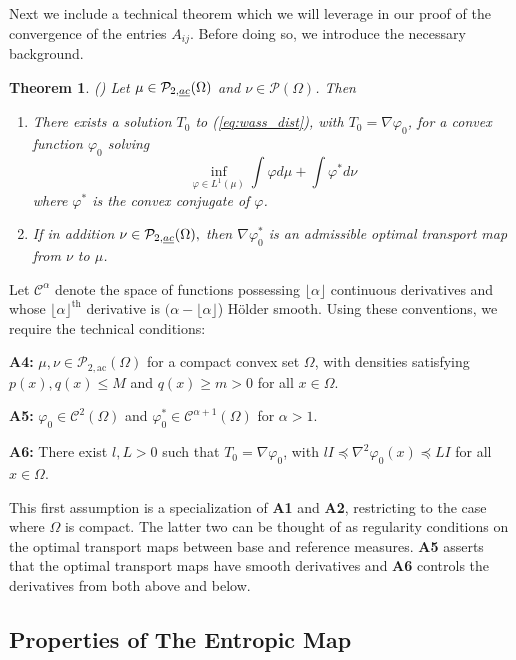\documentclass[nohyperref]{article}
\newtheorem{theorem}{Theorem}
\theoremstyle{definition}
\begin{document}
Next we include a technical theorem which we will leverage in our proof of the convergence of the entries $A_{ij}$. Before doing so, we introduce the necessary background.
\begin{theorem}(\cite{brenier1991polar}) Let $\mu \in \mathcal{P}_{2,\emph{ac}}(\Omega)$ and $\nu \in \mathcal{P}(\Omega)$. Then
\begin{enumerate}
    \item There exists a solution $T_0$ to (\ref{eq:wass_dist}), with $T_0 = \nabla \varphi_0$, for a convex function $\varphi_0$ solving
    $$\inf_{\varphi \in L^1(\mu)} \int \varphi d\mu + \int \varphi^* d\nu$$
    where $\varphi^*$ is the convex conjugate of $\varphi$.
    \item If in addition $\nu \in \mathcal{P}_{2,\emph{ac}}(\Omega), $ then $\nabla \varphi_0^*$ is an admissible optimal transport map from $\nu$ to $\mu$.
\end{enumerate}
\end{theorem}
Let $\mathcal{C}^\alpha$ denote the space of functions possessing $\lfloor \alpha \rfloor$ continuous derivatives and whose $\lfloor \alpha \rfloor^{\text{th}}$ derivative is $(\alpha - \lfloor \alpha \rfloor$) H{\"o}lder smooth. Using these conventions, we require the technical conditions:

\textbf{A4:}  $\mu,\nu \in \mathcal{P}_{2,\text{ac}}(\Omega)$ for a compact convex set $\Omega$, with densities satisfying $p(x),q(x) \leq M$ and $q(x) \geq m > 0$ for all $x \in \Omega$.

\textbf{A5:}  $\varphi_0 \in \mathcal{C}^2(\Omega)$ and $\varphi^*_0 \in \mathcal{C}^{\alpha+1}(\Omega)$ for $\alpha > 1$.

\textbf{A6:}  There exist $l,L>0$ such that $T_0 = \nabla \varphi_0$, with $lI \preceq \nabla^2\varphi_0(x) \preceq LI$ for all $x \in \Omega$.

This first assumption is a specialization of \textbf{A1} and \textbf{A2}, restricting to the case where $\Omega$ is compact. The latter two can be thought of as regularity conditions on the optimal transport maps between base and reference measures. \textbf{A5} asserts that the optimal transport maps have smooth derivatives and \textbf{A6} controls the derivatives from both above and below. 

\subsection{Properties of The Entropic Map}
\label{SM:Entropic_Map}
\end{document}
